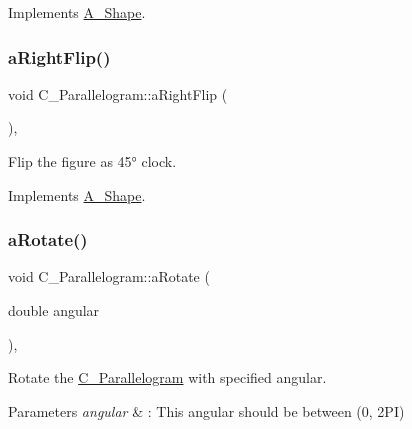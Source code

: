 Implements \hyperlink{classA__Shape_afe2c7969d647f6358da13879a7534ecb}{A\+\_\+\+Shape}.

\mbox{\label{classC__Parallelogram_ab638d55c999ea10da7b5000fd034fbc1}} 
\subsubsection{\texorpdfstring{a\+Right\+Flip()}{aRightFlip()}}
{\footnotesize\ttfamily void C\+\_\+\+Parallelogram\+::a\+Right\+Flip (\begin{DoxyParamCaption}{ }\end{DoxyParamCaption})\hspace{0.3cm}{\ttfamily [override]}, {\ttfamily [virtual]}}



Flip the figure as 45° clock. 



Implements \hyperlink{classA__Shape_a892688cbbad3297e00e87cce0dbfc76d}{A\+\_\+\+Shape}.

\mbox{\label{classC__Parallelogram_a07b6dfae7100a409cdcf04d710ac9c3f}} 
\subsubsection{\texorpdfstring{a\+Rotate()}{aRotate()}}
{\footnotesize\ttfamily void C\+\_\+\+Parallelogram\+::a\+Rotate (\begin{DoxyParamCaption}\item[{double}]{angular }\end{DoxyParamCaption})\hspace{0.3cm}{\ttfamily [override]}, {\ttfamily [virtual]}}



Rotate the \hyperlink{classC__Parallelogram}{C\+\_\+\+Parallelogram} with specified angular. 


\begin{DoxyParams}{Parameters}
{\em angular} & \+: This angular should be between (0, 2\+PI) \\
\hline
\end{DoxyParams}


